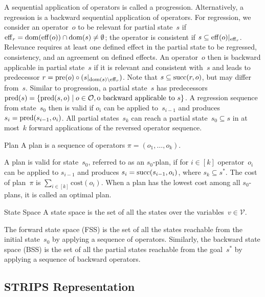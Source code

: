 A sequential application of operators is called a progression. Alternatively, a regression is a backward sequential application of operators. For regression, we consider an operator~$o$ to be relevant for partial state~$s$ if $\operatorname{eff}_r=\operatorname{dom}(\operatorname{eff}(o))\cap\operatorname{dom}(s)\neq\emptyset$; the operator is consistent if $s \subseteq \operatorname{eff}(o)|_{\operatorname{eff}_r}$. Relevance requires at least one defined effect in the partial state to be regressed, consistency, and an agreement on defined effects. An operator~$o$ then is backward applicable in partial state~$s$ if it is relevant and consistent with~$s$ and leads to predecessor $r=\operatorname{pre}(o)\circ (s|_{\operatorname{dom}(s)\setminus\operatorname{eff}_r})$. Note that $s \subseteq \operatorname{succ}(r,o)$, but may differ from~$s$. Similar to progression, a partial state~$s$ has predecessors $\operatorname{pred}(s)=\{\operatorname{pred}(s,o)\mid o\in \mathcal{O}, \text{o backward applicable to }s\}$. A regression sequence from state~$s_0$ then is valid if $o_i$ can be applied to~$s_{i-1}$ and produces~$s_i=\operatorname{pred}(s_{i-1},o_i)$. All partial states~$s_k$ can reach a partial state~$s_0 \subseteq s$ in at most~$k$ forward applications of the reversed operator sequence.

\begin{definition}{Plan}
    \label{def:plan}
    A plan is a sequence of operators $\pi=(o_1,\ldots,o_k)$.
\end{definition}

A plan is valid for state~$s_0$, referred to as an $s_0$-plan, if for $i\in[k]$ operator~$o_i$ can be applied to $s_{i-1}$ and produces $s_i=\operatorname{succ}(s_{i-1},o_i)$, where $s_k \subseteq s^*$. The cost of plan~$\pi$ is $\sum_{i\in[k]} \text{cost}(o_i)$. When a plan has the lowest cost among all $s_0$-plans, it is called an optimal plan.

\begin{definition}{State Space}
    \label{def:statespace}
    A state space is the set of all the states over the variables~$v \in \mathcal{V}$.
\end{definition}

The forward state space (FSS) is the set of all the states reachable from the initial state~$s_0$ by applying a sequence of operators. Similarly, the backward state space (BSS) is the set of all the partial states reachable from the goal~$s^*$ by applying a sequence of backward operators.

\subsection{STRIPS Representation}
\label{sec:strips}

